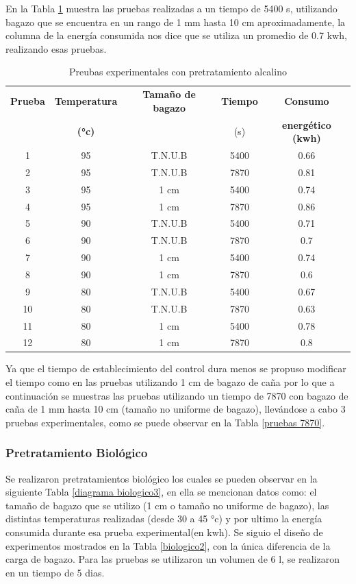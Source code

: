 \documentclass[12pt]{article}
\begin{document}
	En la Tabla \ref{Pretratamiento Alcalino} muestra las pruebas realizadas a un tiempo de 5400 s, utilizando bagazo que se encuentra en un rango de 1 mm hasta 10 cm aproximadamente, la columna de la energía consumida nos dice que se utiliza un promedio de 0.7 kwh, realizando esas pruebas.
	
	\begin{table}[!ht]
		\centering
		\caption{Preubas experimentales con pretratamiento alcalino}
		\begin{tabular}{|c|c|c|c|c|}
			\hline
			\textbf{Prueba} & \textbf{Temperatura} & \textbf{Tamaño de bagazo} & \textbf{Tiempo} & \textbf{Consumo } \\ 
			&\textbf{ (°c)}& &(s)	&\textbf{ energético (kwh)}\\ \hline
			1 & 95 & T.N.U.B & 5400 & 0.66  \\ \hline
			2 & 95 & T.N.U.B & 7870 & 0.81  \\ \hline
			3 & 95 & 1 cm & 5400 & 0.74 \\ \hline
			4 & 95 & 1 cm & 7870 & 0.86 \\ \hline
			5 & 90 & T.N.U.B & 5400 & 0.71  \\ \hline
			6 & 90 & T.N.U.B & 7870 & 0.7  \\ \hline
			7 & 90 & 1 cm & 5400 & 0.74 \\ \hline
			8 & 90 & 1 cm & 7870 & 0.6 \\ \hline
			9 & 80 & T.N.U.B & 5400 & 0.67  \\ \hline
			10 & 80 & T.N.U.B & 7870 & 0.63  \\ \hline
			11 & 80 & 1 cm & 5400 & 0.78 \\ \hline
			12 & 80 & 1 cm & 7870 & 0.8 \\ \hline
		\end{tabular}
		\label{Pretratamiento Alcalino}
	\end{table}

	Ya que el tiempo de establecimiento del control dura menos se propuso modificar el tiempo como en las pruebas utilizando 1 cm de bagazo de caña por lo que a continuación se muestras las pruebas utilizando un tiempo de 7870 con bagazo de caña de 1 mm hasta 10 cm (tamaño no uniforme de bagazo), llevándose a cabo 3 pruebas experimentales, como se puede observar en la Tabla \ref{pruebas 7870}.
		
	
		
		
		\subsubsection{Pretratamiento Biológico}
		Se realizaron pretratamientos biológico los cuales se pueden observar en la siguiente Tabla \ref{diagrama biologico3}, en ella se mencionan datos como:  el tamaño de bagazo que se utilizo (1 cm o tamaño no uniforme de bagazo), las distintas temperaturas realizadas (desde 30 a 45 °c) y por ultimo la energía consumida durante esa prueba experimental(en kwh). Se siguio el diseño de experimentos mostrados en la Tabla \ref{biologico2}, con la única diferencia de la carga de bagazo. Para las pruebas se utilizaron un volumen de 6 l, se realizaron en un tiempo de 5 dias.
	
\end{document}
